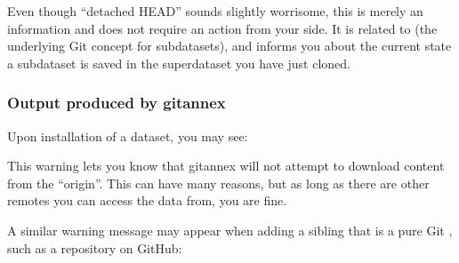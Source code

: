 \sphinxAtStartPar
Even though “detached HEAD” sounds slightly worrisome, this is merely an information
and does not require an action from your side. It is related to
 (the underlying
Git concept for subdatasets), and informs you about the current state a
subdataset is saved in the superdataset you have just cloned.


\subsubsection{Output produced by git\sphinxhyphen{}annex}
\label{\detokenize{basics/101-135-help:output-produced-by-git-annex}}
\sphinxAtStartPar
{}

\sphinxAtStartPar
Upon installation of a dataset, you may see:

\begin{sphinxVerbatim}[commandchars=\\\{\}]
\end{sphinxVerbatim}

\sphinxAtStartPar
This warning lets you know that git\sphinxhyphen{}annex will not attempt to download
content from the {\hyperref[\detokenize{glossary:term-remote}]{}} “origin”. This can have
many reasons, but as long as there are other remotes you can access the
data from, you are fine.

\sphinxAtStartPar
A similar warning message may appear when adding a sibling that is a pure Git
{\hyperref[\detokenize{glossary:term-remote}]{}}, such as a repository on GitHub:

\begin{sphinxVerbatim}[commandchars=\\\{\}]
\end{sphinxVerbatim}

